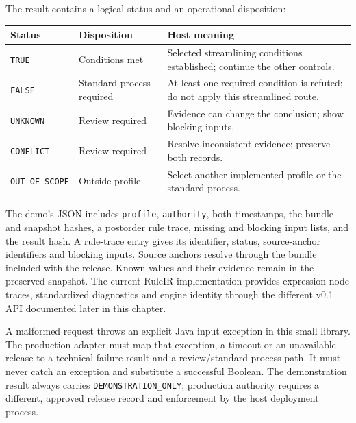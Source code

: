 
The result contains a logical status and an operational disposition:
\begin{center}\small
\begin{tabularx}{\textwidth}{P{0.18\textwidth}P{0.34\textwidth}Y}
\toprule Status & Disposition & Host meaning \\\midrule
\texttt{TRUE} & Conditions met & Selected streamlining conditions established; continue the other controls.\\
\texttt{FALSE} & Standard process required & At least one required condition is refuted; do not apply this streamlined route.\\
\texttt{UNKNOWN} & Review required & Evidence can change the conclusion; show blocking inputs.\\
\texttt{CONFLICT} & Review required & Resolve inconsistent evidence; preserve both records.\\
\texttt{OUT\_OF\_SCOPE} & Outside profile & Select another implemented profile or the standard process.\\
\bottomrule
\end{tabularx}
\end{center}
The demo's JSON includes \texttt{profile}, \texttt{authority}, both timestamps,
the bundle and snapshot hashes, a postorder rule trace, missing and blocking
input lists, and the result hash. A rule-trace entry gives its identifier,
status, source-anchor identifiers and blocking inputs. Source anchors resolve
through the bundle included with the release. Known values and their evidence
remain in the preserved snapshot. The current RuleIR implementation provides expression-node traces,
standardized diagnostics and engine identity through the different v0.1 API
documented later in this chapter.

A malformed request throws an explicit Java input exception in this small
library. The production adapter must map that exception, a timeout or an
unavailable release to a technical-failure result and a review/standard-process
path. It must never catch an exception and substitute a successful Boolean.
The demonstration result always carries \texttt{DEMONSTRATION\_ONLY}; production
authority requires a different, approved release record and enforcement by the
host deployment process.

